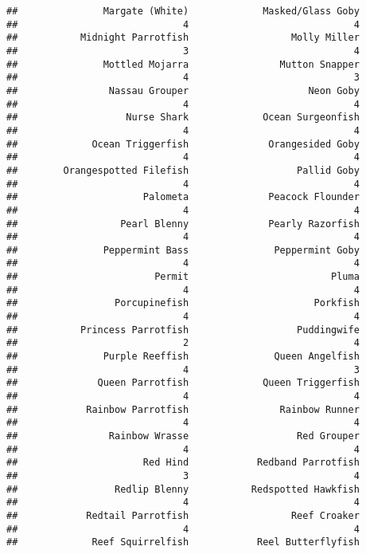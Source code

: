 \documentclass[
]{article}
\begin{document}
\begin{verbatim}
##               Margate (White)             Masked/Glass Goby 
##                             4                             4 
##           Midnight Parrotfish                  Molly Miller 
##                             3                             4 
##               Mottled Mojarra                Mutton Snapper 
##                             4                             3 
##                Nassau Grouper                     Neon Goby 
##                             4                             4 
##                   Nurse Shark             Ocean Surgeonfish 
##                             4                             4 
##             Ocean Triggerfish              Orangesided Goby 
##                             4                             4 
##        Orangespotted Filefish                   Pallid Goby 
##                             4                             4 
##                      Palometa              Peacock Flounder 
##                             4                             4 
##                  Pearl Blenny              Pearly Razorfish 
##                             4                             4 
##               Peppermint Bass               Peppermint Goby 
##                             4                             4 
##                        Permit                         Pluma 
##                             4                             4 
##                 Porcupinefish                      Porkfish 
##                             4                             4 
##           Princess Parrotfish                   Puddingwife 
##                             2                             4 
##               Purple Reeffish               Queen Angelfish 
##                             4                             3 
##              Queen Parrotfish             Queen Triggerfish 
##                             4                             4 
##            Rainbow Parrotfish                Rainbow Runner 
##                             4                             4 
##                Rainbow Wrasse                   Red Grouper 
##                             4                             4 
##                      Red Hind            Redband Parrotfish 
##                             3                             4 
##                 Redlip Blenny           Redspotted Hawkfish 
##                             4                             4 
##            Redtail Parrotfish                  Reef Croaker 
##                             4                             4 
##             Reef Squirrelfish            Reel Butterflyfish 

\end{verbatim}
\end{document}
